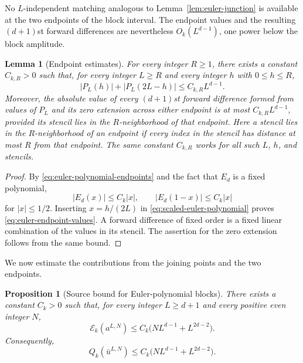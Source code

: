 \documentclass[11pt]{amsart}
\theoremstyle{plain}
\newtheorem{lemma}[theorem]{Lemma}
\newtheorem{proposition}[theorem]{Proposition}
\theoremstyle{definition}
\theoremstyle{remark}
\numberwithin{equation}{section}
\theoremstyle{plain}
\begin{document}
No $L$-independent matching analogous to
Lemma~\ref{lem:euler-junction} is available at the two endpoints of the block
interval.  The endpoint values and
the resulting $(d+1)$st forward differences are nevertheless
$O_k(L^{d-1})$, one power below the block amplitude.

\begin{lemma}[Endpoint estimates]
	\label{lem:euler-endpoints}
	For every integer $R\ge1$, there exists a constant $C_{k,R}>0$ such
	that, for every integer $L\ge R$ and every integer $h$ with $0\le h\le R$,
	\begin{equation}\label{eq:euler-endpoint-values}
		|P_L(h)|+|P_L(2L-h)|\le C_{k,R}L^{d-1}.
	\end{equation}
	Moreover, the absolute value of every $(d+1)$st forward difference
	formed from values of $P_L$ and its zero extension across either endpoint is
	at most $C_{k,R}L^{d-1}$, provided its stencil lies in the $R$-neighborhood
	of that endpoint.  Here a stencil lies in the $R$-neighborhood of an
	endpoint if every index in the stencil has distance at most $R$ from that
	endpoint.  The same constant $C_{k,R}$ works for all such $L$, $h$, and
	stencils.
\end{lemma}

\begin{proof}
	By \eqref{eq:euler-polynomial-endpoints} and the fact that $E_d$ is a fixed
	polynomial,
	\[
	|E_d(x)|\le C_k|x|,
	\qquad
	|E_d(1-x)|\le C_k|x|
	\]
	for $|x|\le1/2$.  Inserting $x=h/(2L)$ in
	\eqref{eq:scaled-euler-polynomial} proves
	\eqref{eq:euler-endpoint-values}.  A forward difference of fixed order is a
	fixed linear combination of the values in its stencil.  The assertion for
	the zero extension follows from the same bound.
\end{proof}

We now estimate the contributions from the joining points and the two
endpoints.

\begin{proposition}[Source bound for Euler-polynomial blocks]
	\label{prop:euler-source}
	There exists a constant $C_k>0$ such that, for every
	integer $L\ge d+1$ and every positive even integer $N$,
	\begin{equation}\label{eq:euler-source-functional-bound}
		\mathcal E_k(a^{L,N})
		\le C_k\bigl(NL^{d-1}+L^{2d-2}\bigr).
	\end{equation}
	Consequently,
	\begin{equation}\label{eq:euler-source-bound}
		Q_k(\bar u^{L,N})
		\le C_k\bigl(NL^{d-1}+L^{2d-2}\bigr).
	\end{equation}
\end{proposition}
\end{document}
